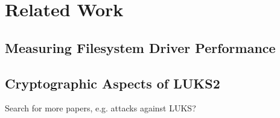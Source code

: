 \section{Related Work}

\subsection{Measuring Filesystem Driver Performance}

\subsection{Cryptographic Aspects of LUKS2}
\cite{Fruhwirth2005}

Search for more papers, e.g. attacks against LUKS?